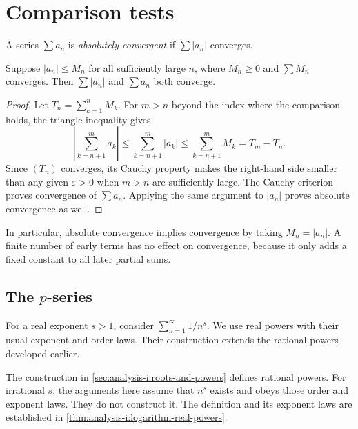 \section{Comparison tests}
\label{sec:analysis-i:comparison-tests}

\begin{definition}
  A series $\sum a_n$ is \emph{absolutely convergent} if
  $\sum |a_n|$ converges.
\end{definition}

\begin{theorem}
  \label{thm:analysis-i:series-comparison}
  Suppose $|a_n|\le M_n$ for all sufficiently large $n$, where
  $M_n\ge0$ and $\sum M_n$ converges. Then $\sum |a_n|$ and
  $\sum a_n$ both converge.
\end{theorem}

\begin{proof}
  Let $T_n=\sum_{k=1}^n M_k$. For $m>n$ beyond the index where
  the comparison holds, the triangle inequality gives
  \[
    \left|\sum_{k=n+1}^{m}a_k\right|
    \le\sum_{k=n+1}^{m}|a_k|
    \le\sum_{k=n+1}^{m}M_k=T_m-T_n.
  \]
  Since $(T_n)$ converges, its Cauchy property makes the right-hand
  side smaller than any given $\varepsilon>0$ when $m>n$ are
  sufficiently large. The Cauchy criterion proves convergence of
  $\sum a_n$. Applying the same argument to $|a_n|$ proves absolute
  convergence as well.
\end{proof}

In particular, absolute convergence implies convergence by taking
$M_n=|a_n|$. A finite number of early terms has no effect on convergence,
because it only adds a fixed constant to all later partial sums.

\subsection{The \texorpdfstring{$p$}{p}-series}

For a real exponent $s>1$, consider $\sum_{n=1}^{\infty}1/n^s$.
We use real powers with their usual exponent and order
laws. Their construction extends the rational powers developed earlier.

The construction in \autoref{sec:analysis-i:roots-and-powers} defines
rational powers. For irrational $s$, the arguments here assume that
$n^s$ exists and obeys those order and exponent laws. They do not
construct it. The definition and its exponent laws are established in
\autoref{thm:analysis-i:logarithm-real-powers}.

